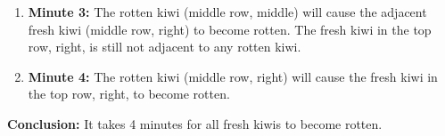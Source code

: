 \begin{answerbox}
\begin{enumerate}
    \item \textbf{Minute 3:}  
    The rotten kiwi (middle row, middle) will cause the adjacent fresh kiwi (middle row, right) to become rotten.  
    The fresh kiwi in the top row, right, is still not adjacent to any rotten kiwi.

    \item \textbf{Minute 4:}  
    The rotten kiwi (middle row, right) will cause the fresh kiwi in the top row, right, to become rotten.
\end{enumerate}

\textbf{Conclusion:}
It takes 4 minutes for all fresh kiwis to become rotten.

\end{answerbox}
